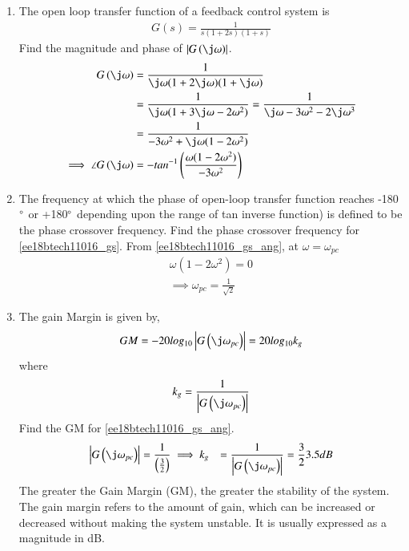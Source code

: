 \begin{enumerate}[label=\thesection.\arabic*.,ref=\thesection.\theenumi]
\item The open loop transfer function of a feedback control system is  
\begin{align}
G(s) = \frac{1}{s(1+2s)(1+s)} 
\label{ee18btech11016_gs}
\end{align}
%
Find the magnitude and phase of $\abs{G\brak{\j\omega}}$.
\\
\solution
\begin{align}
G\brak{\j\omega} &= \frac{1}{\j\omega(1+2\j\omega)(1+\j\omega)} 
\\
 &= \frac{1}{\j\omega(1+3\j\omega-2\omega^2)}=\frac{1}{\j\omega-3\omega^2-2\j\omega^3}
\\
 &= \frac{1}{-3\omega^2+\j\omega(1-2\omega^2)} 
\\
\implies \angle G\brak{\j\omega}&=- tan^{-1}\brak{\frac{\omega(1-2\omega^2)}{-3\omega^2}}
\label{ee18btech11016_gs_ang}
\end{align}
%
\item The frequency at which the phase of open-loop transfer function reaches -180$\degree$ or +180$\degree$ depending upon the range of tan inverse function) is defined to be the phase crossover frequency.  Find the phase crossover frequency for  \eqref{ee18btech11016_gs}.
\solution From \eqref{ee18btech11016_gs_ang}, at $\omega=\omega_{pc}$ 
\begin{align}
\omega(1-2\omega^2) = 0 
\\
\implies \omega_{pc} = \frac{1}{\sqrt{2}} 
\end{align}
\item The gain Margin is given by,
\begin{align}
GM = -20log_{10}\abs{G\brak{\j\omega_{pc}}} = 20log_{10}k_{g}
\end{align}
where 
\begin{align}
k_{g}=\frac{1}{\abs{G\brak{\j\omega_{pc}}}} 
\end{align}
%
Find the GM for \eqref{ee18btech11016_gs_ang}.
\\
\solution 
\begin{align}
\abs{G\brak{\j\omega_{pc}}} &= \frac{1}{\brak{\frac{3}{2}}}
\implies k_{g}&=\frac{1}{\abs{G\brak{\j\omega_{pc}}}} = \frac{3}{2}
3.5dB
\end{align}
The greater the Gain Margin (GM), the greater the stability of the system. The gain margin refers to the amount of gain, which can be increased or decreased without making the system unstable. It is usually expressed as a magnitude in dB.

\end{enumerate}
